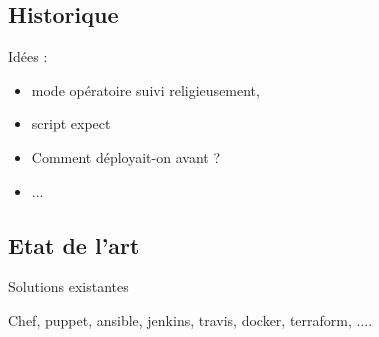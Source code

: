 \subsection{Historique}

	
Idées : 

\begin{itemize}
	\item mode opératoire suivi religieusement, 
	\item script expect
	\item Comment déployait-on avant ?
	\item ...
\end{itemize}

\subsection{Etat de l'art}

Solutions existantes

Chef, puppet, ansible, jenkins, travis, docker, terraform, ....
